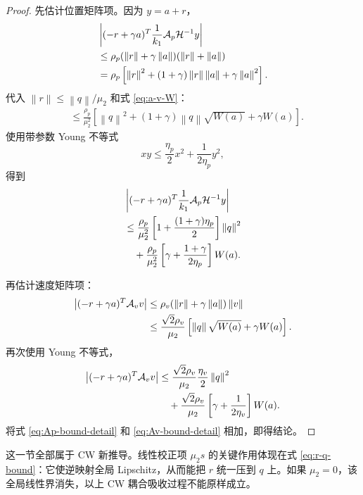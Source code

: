 \documentclass[UTF8,a4paper,12pt]{ctexart}
\newcommand{\norm}[1]{\left\lVert #1\right\rVert}
\newcommand{\abs}[1]{\left\lvert #1\right\rvert}
\newcommand{\cH}{\mathcal H}
\newcommand{\Ap}{\mathcal A_p}
\newcommand{\Av}{\mathcal A_v}
\begin{document}
\begin{proof}
先估计位置矩阵项。因为 $y=a+r$，
\begin{align}
 &\abs{(-r+\gamma a)^T\frac1{k_1}\Ap\cH^{-1}y}\notag\\
 &\le\rho_p(\norm r+\gamma\norm a)(\norm r+\norm a)\notag\\
 &=\rho_p\left[\norm r^2+(1+\gamma)\norm r\norm a
 +\gamma\norm a^2\right].
\end{align}
代入 $\norm r\le\norm q/\mu_2$ 和式 \eqref{eq:a-v-W}：
\begin{align}
 &\le\frac{\rho_p}{\mu_2^2}
 \left[\norm q^2+(1+\gamma)\norm q\sqrt{W(a)}+\gamma W(a)\right].
\end{align}
使用带参数 Young 不等式
\begin{equation}
 xy\le\frac{\eta_p}{2}x^2+\frac{1}{2\eta_p}y^2,
\end{equation}
得到
\begin{align}
 &\abs{(-r+\gamma a)^T\frac1{k_1}\Ap\cH^{-1}y}\notag\\
 &\le\frac{\rho_p}{\mu_2^2}
 \left[1+\frac{(1+\gamma)\eta_p}{2}\right]\norm q^2\notag\\
 &\quad+\frac{\rho_p}{\mu_2^2}
 \left[\gamma+\frac{1+\gamma}{2\eta_p}\right]W(a).
\label{eq:Ap-bound-detail}
\end{align}

再估计速度矩阵项：
\begin{align}
 \abs{(-r+\gamma a)^T\Av v}
 &\le\rho_v(\norm r+\gamma\norm a)\norm v\notag\\
 &\le\frac{\sqrt2\rho_v}{\mu_2}
 \left[\norm q\sqrt{W(a)}+\gamma W(a)\right].
\end{align}
再次使用 Young 不等式，
\begin{align}
 \abs{(-r+\gamma a)^T\Av v}
 &\le\frac{\sqrt2\rho_v}{\mu_2}\frac{\eta_v}{2}\norm q^2\notag\\
 &\quad+\frac{\sqrt2\rho_v}{\mu_2}
 \left[\gamma+\frac1{2\eta_v}\right]W(a).
\label{eq:Av-bound-detail}
\end{align}
将式 \eqref{eq:Ap-bound-detail} 和 \eqref{eq:Av-bound-detail} 相加，即得结论。
\end{proof}

\begin{cwbox}
这一节全部属于 CW 新推导。线性校正项 $\mu_2s$ 的关键作用体现在式 \eqref{eq:r-q-bound}：它使逆映射全局 Lipschitz，从而能把 $r$ 统一压到 $q$ 上。如果 $\mu_2=0$，该全局线性界消失，以上 CW 耦合吸收过程不能原样成立。
\end{cwbox}
\end{document}
